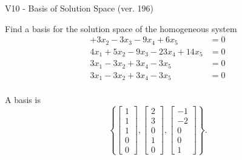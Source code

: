 \begin{exercise}
  \begin{exerciseTitle}V10 - Basis of Solution Space (ver. 196)\end{exerciseTitle}
  \begin{exerciseStatement}
    Find a basis for the solution space of the homogeneous system 
\begin{align*}
 + 3 x_ 2 -3 x_ 3 -9 x_ 4 + 6 x_ 5 &= 0  \\ 
  4 x_ 1 + 5 x_ 2 -9 x_ 3 -23 x_ 4 + 14 x_ 5 &= 0  \\ 
  3 x_ 1 -3 x_ 2 + 3 x_ 4 -3 x_ 5 &= 0  \\ 
  3 x_ 1 -3 x_ 2 + 3 x_ 4 -3 x_ 5 &= 0  \\ 
 \end{align*}


 
  \end{exerciseStatement}

  \begin{exerciseAnswer}
   A basis is   
\[\left\{\left[\begin{array}{c}
1 \\
1 \\
1 \\
0 \\
0
\end{array}\right] , \left[\begin{array}{c}
2 \\
3 \\
0 \\
1 \\
0
\end{array}\right] , \left[\begin{array}{c}
-1 \\
-2 \\
0 \\
0 \\
1
\end{array}\right]\right\}.\]

  


  \end{exerciseAnswer}
\end{exercise}